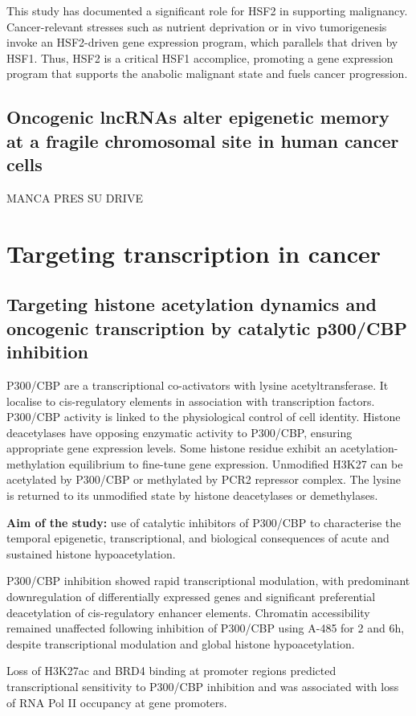 This study has documented a significant role for HSF2 in supporting malignancy. Cancer-relevant stresses such as nutrient
deprivation or in vivo tumorigenesis invoke an HSF2-driven gene expression program, which parallels that driven by HSF1.
Thus, HSF2 is a critical HSF1 accomplice, promoting a gene expression program that supports the anabolic malignant state
and fuels cancer progression.

\subsection{Oncogenic lncRNAs alter epigenetic memory at a fragile chromosomal site in human cancer cells}
MANCA PRES SU DRIVE

\section{Targeting transcription in cancer}
\subsection{Targeting histone acetylation dynamics and oncogenic transcription by catalytic p300/CBP inhibition}
P300/CBP are a transcriptional co-activators with lysine acetyltransferase. It localise to cis-regulatory elements in association with transcription factors. P300/CBP activity is linked to the physiological control of cell identity. Histone deacetylases have opposing enzymatic activity to P300/CBP, ensuring appropriate gene expression levels.
Some histone residue exhibit an acetylation-methylation equilibrium to fine-tune gene expression.
Unmodified H3K27  can be acetylated by P300/CBP or methylated by PCR2 repressor complex. The lysine is returned to its unmodified state by histone deacetylases or demethylases.

\textbf{Aim of the study:} use of catalytic inhibitors of P300/CBP to characterise the temporal epigenetic, transcriptional, and biological consequences of acute and sustained histone hypoacetylation.

P300/CBP inhibition showed rapid transcriptional modulation, with predominant downregulation of differentially expressed genes and significant preferential deacetylation of cis-regulatory enhancer elements. Chromatin accessibility remained unaffected following inhibition of P300/CBP using A-485 for 2 and 6h, despite transcriptional modulation and global histone hypoacetylation. 

Loss of H3K27ac and BRD4 binding at promoter regions predicted transcriptional sensitivity to P300/CBP inhibition and was associated with loss of RNA Pol II occupancy at gene promoters.

